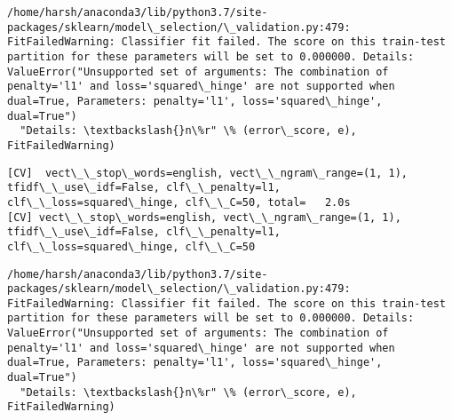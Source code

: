 \documentclass[11pt]{article}
\begin{document}
    \begin{Verbatim}[commandchars=\\\{\}]
/home/harsh/anaconda3/lib/python3.7/site-packages/sklearn/model\_selection/\_validation.py:479: FitFailedWarning: Classifier fit failed. The score on this train-test partition for these parameters will be set to 0.000000. Details: 
ValueError("Unsupported set of arguments: The combination of penalty='l1' and loss='squared\_hinge' are not supported when dual=True, Parameters: penalty='l1', loss='squared\_hinge', dual=True")
  "Details: \textbackslash{}n\%r" \% (error\_score, e), FitFailedWarning)

    \end{Verbatim}

    \begin{Verbatim}[commandchars=\\\{\}]
[CV]  vect\_\_stop\_words=english, vect\_\_ngram\_range=(1, 1), tfidf\_\_use\_idf=False, clf\_\_penalty=l1, clf\_\_loss=squared\_hinge, clf\_\_C=50, total=   2.0s
[CV] vect\_\_stop\_words=english, vect\_\_ngram\_range=(1, 1), tfidf\_\_use\_idf=False, clf\_\_penalty=l1, clf\_\_loss=squared\_hinge, clf\_\_C=50 

    \end{Verbatim}

    \begin{Verbatim}[commandchars=\\\{\}]
/home/harsh/anaconda3/lib/python3.7/site-packages/sklearn/model\_selection/\_validation.py:479: FitFailedWarning: Classifier fit failed. The score on this train-test partition for these parameters will be set to 0.000000. Details: 
ValueError("Unsupported set of arguments: The combination of penalty='l1' and loss='squared\_hinge' are not supported when dual=True, Parameters: penalty='l1', loss='squared\_hinge', dual=True")
  "Details: \textbackslash{}n\%r" \% (error\_score, e), FitFailedWarning)

    \end{Verbatim}
\end{document}
